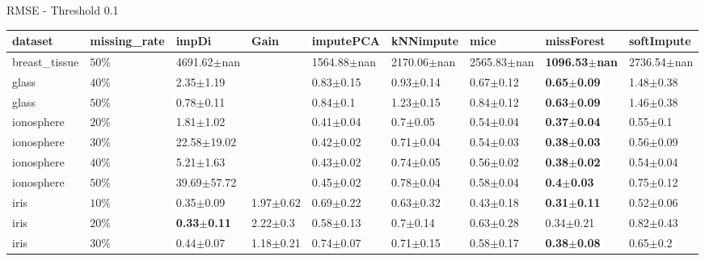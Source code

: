 

 RMSE - Threshold 0.1 
 \begin{tabular}{lllllllll}
\toprule
      dataset & missing_rate &                   impDi &            Gain &                imputePCA &                kNNimpute &            mice &               missForest &        softImpute \\
\midrule
breast_tissue &     $ 50\% $ &         4691.62$\pm$nan &                 &          1564.88$\pm$nan &          2170.06$\pm$nan & 2565.83$\pm$nan & \textbf{1096.53$\pm$nan} &   2736.54$\pm$nan \\
        glass &     $ 40\% $ &           2.35$\pm$1.19 &                 &            0.83$\pm$0.15 &            0.93$\pm$0.14 &   0.67$\pm$0.12 &   \textbf{0.65$\pm$0.09} &     1.48$\pm$0.38 \\
        glass &     $ 50\% $ &           0.78$\pm$0.11 &                 &             0.84$\pm$0.1 &            1.23$\pm$0.15 &   0.84$\pm$0.12 &   \textbf{0.63$\pm$0.09} &     1.46$\pm$0.38 \\
   ionosphere &     $ 20\% $ &           1.81$\pm$1.02 &                 &            0.41$\pm$0.04 &             0.7$\pm$0.05 &   0.54$\pm$0.04 &   \textbf{0.37$\pm$0.04} &      0.55$\pm$0.1 \\
   ionosphere &     $ 30\% $ &         22.58$\pm$19.02 &                 &            0.42$\pm$0.02 &            0.71$\pm$0.04 &   0.54$\pm$0.03 &   \textbf{0.38$\pm$0.03} &     0.56$\pm$0.09 \\
   ionosphere &     $ 40\% $ &           5.21$\pm$1.63 &                 &            0.43$\pm$0.02 &            0.74$\pm$0.05 &   0.56$\pm$0.02 &   \textbf{0.38$\pm$0.02} &     0.54$\pm$0.04 \\
   ionosphere &     $ 50\% $ &         39.69$\pm$57.72 &                 &            0.45$\pm$0.02 &            0.78$\pm$0.04 &   0.58$\pm$0.04 &    \textbf{0.4$\pm$0.03} &     0.75$\pm$0.12 \\
         iris &     $ 10\% $ &           0.35$\pm$0.09 &   1.97$\pm$0.62 &            0.69$\pm$0.22 &            0.63$\pm$0.32 &   0.43$\pm$0.18 &   \textbf{0.31$\pm$0.11} &     0.52$\pm$0.06 \\
         iris &     $ 20\% $ &  \textbf{0.33$\pm$0.11} &    2.22$\pm$0.3 &            0.58$\pm$0.13 &             0.7$\pm$0.14 &   0.63$\pm$0.28 &            0.34$\pm$0.21 &     0.82$\pm$0.43 \\
         iris &     $ 30\% $ &           0.44$\pm$0.07 &   1.18$\pm$0.21 &            0.74$\pm$0.07 &            0.71$\pm$0.15 &   0.58$\pm$0.17 &   \textbf{0.38$\pm$0.08} &      0.65$\pm$0.2 \\

\end{tabular}
